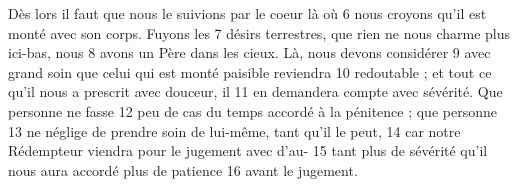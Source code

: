 Dès lors il faut que nous le suivions par le coeur là où	 
6	 	nous croyons qu'il est monté avec son corps. Fuyons les	 
7	 	désirs terrestres, que rien ne nous charme plus ici-bas, nous	 
8	 	avons un Père dans les cieux. Là, nous devons considérer	 
9	 	avec grand soin que celui qui est monté paisible reviendra	 
10	 	redoutable ; et tout ce qu'il nous a prescrit avec douceur, il	 
11	 	en demandera compte avec sévérité. Que personne ne fasse	 
12	 	peu de cas du temps accordé à la pénitence ; que personne	 
13	 	ne néglige de prendre soin de lui-même, tant qu'il le peut,	 
14	 	car notre Rédempteur viendra pour le jugement avec d'au-	 
15	 	tant plus de sévérité qu'il nous aura accordé plus de patience	 
16	 	avant le jugement.